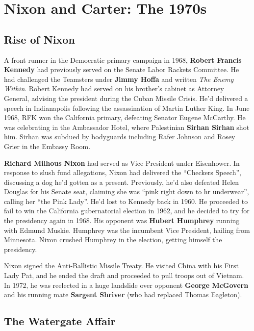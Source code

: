 \section{Nixon and Carter: The 1970s}

\subsection*{Rise of Nixon}

A front runner in the Democratic primary campaign in 1968,
\textbf{Robert Francis Kennedy} had previously served on the Senate Labor Rackets Committee.
He had challenged the Teamsters under \textbf{Jimmy Hoffa} and written \textit{The Enemy Within}.
Robert Kennedy had served on his brother's cabinet as Attorney General,
advising the president during the Cuban Missile Crisis.
He'd delivered a speech in Indianapolis following the assassination of Martin Luther King.
In June 1968, RFK won the California primary, defeating Senator Eugene McCarthy.
He was celebrating in the Ambassador Hotel,
where Palestinian \textbf{Sirhan Sirhan} shot him.
Sirhan was subdued by bodyguards including Rafer Johnson and Rosey Grier in the Embassy Room.

\textbf{Richard Milhous Nixon} had served as Vice President under Eisenhower.
In response to slush fund allegations,
Nixon had delivered the ``Checkers Speech'', discussing a dog he'd gotten as a present.
Previously, he'd also defeated Helen Douglas for his Senate seat,
claiming she was ``pink right down to hr underwear'', calling her ``the Pink Lady''.
He'd lost to Kennedy back in 1960.
He proceeded to fail to win the California gubernatorial election in 1962,
and he decided to try for the presidency again in 1968.
His opponent was \textbf{Hubert Humphrey} running with Edmund Muskie.
Humphrey was the incumbent Vice President, hailing from Minnesota.
Nixon crushed Humphrey in the election, getting himself the presidency.

Nixon signed the Anti-Ballistic Missile Treaty.
He visited China with his First Lady Pat, and he ended the draft and proceeded to pull troops out of Vietnam.
In 1972, he was reelected in a huge landslide over opponent \textbf{George McGovern}
and his running mate \textbf{Sargent Shriver} (who had replaced Thomas Eagleton).

\subsection*{The Watergate Affair}

